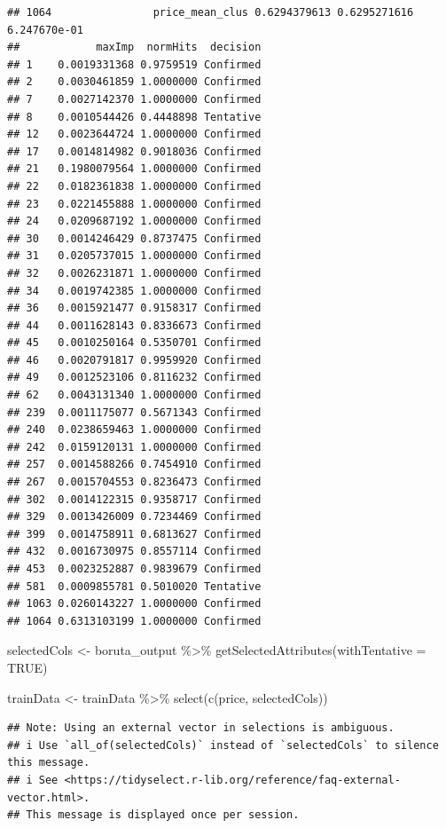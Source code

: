 \documentclass[
]{article}
\newenvironment{Shaded}{\begin{snugshade}}{\end{snugshade}}
\newcommand{\AttributeTok}[1]{\textcolor[rgb]{0.77,0.63,0.00}{#1}}
\newcommand{\ConstantTok}[1]{\textcolor[rgb]{0.00,0.00,0.00}{#1}}
\newcommand{\FunctionTok}[1]{\textcolor[rgb]{0.00,0.00,0.00}{#1}}
\newcommand{\NormalTok}[1]{#1}
\newcommand{\OtherTok}[1]{\textcolor[rgb]{0.56,0.35,0.01}{#1}}
\newcommand{\SpecialCharTok}[1]{\textcolor[rgb]{0.00,0.00,0.00}{#1}}
\begin{document}
\begin{verbatim}
## 1064                price_mean_clus 0.6294379613 0.6295271616 6.247670e-01
##            maxImp  normHits  decision
## 1    0.0019331368 0.9759519 Confirmed
## 2    0.0030461859 1.0000000 Confirmed
## 7    0.0027142370 1.0000000 Confirmed
## 8    0.0010544426 0.4448898 Tentative
## 12   0.0023644724 1.0000000 Confirmed
## 17   0.0014814982 0.9018036 Confirmed
## 21   0.1980079564 1.0000000 Confirmed
## 22   0.0182361838 1.0000000 Confirmed
## 23   0.0221455888 1.0000000 Confirmed
## 24   0.0209687192 1.0000000 Confirmed
## 30   0.0014246429 0.8737475 Confirmed
## 31   0.0205737015 1.0000000 Confirmed
## 32   0.0026231871 1.0000000 Confirmed
## 34   0.0019742385 1.0000000 Confirmed
## 36   0.0015921477 0.9158317 Confirmed
## 44   0.0011628143 0.8336673 Confirmed
## 45   0.0010250164 0.5350701 Confirmed
## 46   0.0020791817 0.9959920 Confirmed
## 49   0.0012523106 0.8116232 Confirmed
## 62   0.0043131340 1.0000000 Confirmed
## 239  0.0011175077 0.5671343 Confirmed
## 240  0.0238659463 1.0000000 Confirmed
## 242  0.0159120131 1.0000000 Confirmed
## 257  0.0014588266 0.7454910 Confirmed
## 267  0.0015704553 0.8236473 Confirmed
## 302  0.0014122315 0.9358717 Confirmed
## 329  0.0013426009 0.7234469 Confirmed
## 399  0.0014758911 0.6813627 Confirmed
## 432  0.0016730975 0.8557114 Confirmed
## 453  0.0023252887 0.9839679 Confirmed
## 581  0.0009855781 0.5010020 Tentative
## 1063 0.0260143227 1.0000000 Confirmed
## 1064 0.6313103199 1.0000000 Confirmed
\end{verbatim}

\begin{Shaded}
\begin{Highlighting}[]
\NormalTok{selectedCols }\OtherTok{\textless{}{-}}\NormalTok{ boruta\_output }\SpecialCharTok{\%\textgreater{}\%} \FunctionTok{getSelectedAttributes}\NormalTok{(}\AttributeTok{withTentative =} \ConstantTok{TRUE}\NormalTok{)}


\NormalTok{trainData }\OtherTok{\textless{}{-}}\NormalTok{ trainData }\SpecialCharTok{\%\textgreater{}\%} \FunctionTok{select}\NormalTok{(}\FunctionTok{c}\NormalTok{(price, selectedCols))}
\end{Highlighting}
\end{Shaded}

\begin{verbatim}
## Note: Using an external vector in selections is ambiguous.
## i Use `all_of(selectedCols)` instead of `selectedCols` to silence this message.
## i See <https://tidyselect.r-lib.org/reference/faq-external-vector.html>.
## This message is displayed once per session.
\end{verbatim}
\end{document}
